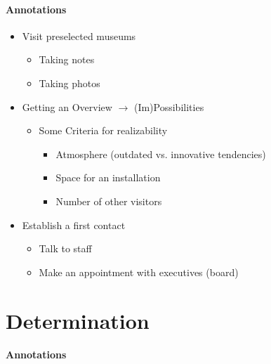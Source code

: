\paragraph{Annotations}

\begin{itemize}
	\item Visit preselected museums
	\begin{itemize}
		\item Taking notes
		\item Taking photos
	\end{itemize}
	\item Getting an Overview $\to$ (Im)Possibilities
	\begin{itemize}
		\item Some Criteria for realizability
		\begin{itemize}
			\item Atmosphere (outdated vs. innovative tendencies)
			\item Space for an installation
			\item Number of other visitors
		\end{itemize}
	\end{itemize}
	\item Establish a first contact
	\begin{itemize}
		\item Talk to staff
		\item Make an appointment with executives (board)
	\end{itemize}
\end{itemize}


\section{Determination}
\label{partnering_determination}

\paragraph{Annotations}


